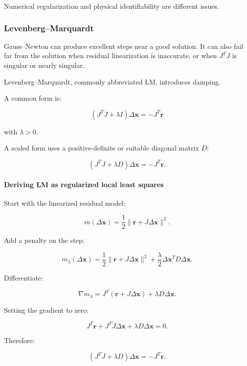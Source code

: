 Numerical regularization and physical identifiability are different issues.

\subsubsection{Levenberg--Marquardt}\label{02-foundations-ii-ch027-levenbergmarquardt}

\hypertarget{02-foundations-ii-ch027-levenbergmarquardt}{}

Gauss--Newton can produce excellent steps near a good solution. It can also fail far from the solution when residual linearization is inaccurate, or when \(J^TJ\) is singular or nearly singular.

Levenberg--Marquardt, commonly abbreviated LM, introduces damping.

A common form is:

\[
\boxed{ (J^TJ+\lambda I)\Delta\mathbf x=-J^T\mathbf r }
\]

with \(\lambda>0\).

A scaled form uses a positive-definite or suitable diagonal matrix \(D\):

\[
\boxed{ (J^TJ+\lambda D)\Delta\mathbf x=-J^T\mathbf r. }
\]

\paragraph{Deriving LM as regularized local least squares}\label{02-foundations-ii-ch027-deriving-lm-as-regularized-local-least-squares}

\hypertarget{02-foundations-ii-ch027-deriving-lm-as-regularized-local-least-squares}{}

Start with the linearized residual model:

\[
m(\Delta\mathbf x) = \frac12\|\mathbf r+J\Delta\mathbf x\|^2.
\]

Add a penalty on the step:

\[
m_\lambda(\Delta\mathbf x) = \frac12\|\mathbf r+J\Delta\mathbf x\|^2 +\frac\lambda2\Delta\mathbf x^TD\Delta\mathbf x.
\]

Differentiate:

\[
\nabla m_\lambda= J^T(\mathbf r+J\Delta\mathbf x) +\lambda D\Delta\mathbf x.
\]

Setting the gradient to zero:

\[
J^T\mathbf r+ J^TJ\Delta\mathbf x+ \lambda D\Delta\mathbf x=0.
\]

Therefore:

\[
\boxed{ (J^TJ+\lambda D)\Delta\mathbf x=-J^T\mathbf r }.
\]

